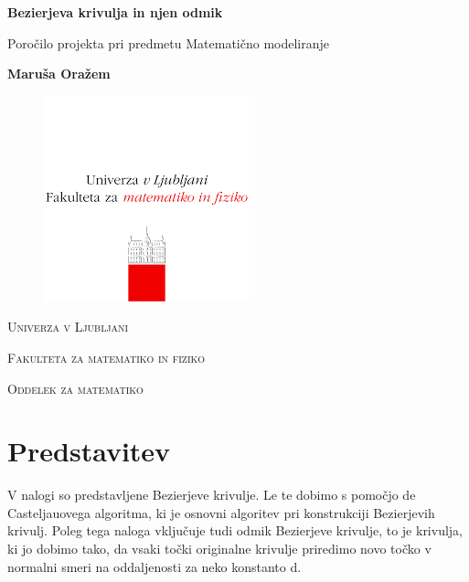 \documentclass{article}
\begin{document}
\begin{titlepage}
   \begin{center}
       \vspace*{1cm}
 
       \textbf{\Huge{Bezierjeva krivulja in njen odmik}}
 
       \vspace{0.5cm}
        \Large{Poročilo projekta pri predmetu Matematično modeliranje}
 
       \vspace{1.5cm}
    \vfill
       \textbf{Maruša Oražem}
 
       
 \begin{figure}[!ht]
\centering
       \includegraphics{fmf.png}
\end{figure}
 
       \textsc{\large{Univerza v Ljubljani}}
    
        \textsc{\large{Fakulteta za matematiko in fiziko}}
    
     \textsc{\large{Oddelek za matematiko}}
    \vfill\vfill
 
   \end{center}
\end{titlepage}






\tableofcontents











\newpage

\section{Predstavitev}
V nalogi so predstavljene Bezierjeve krivulje. Le te dobimo s pomočjo de Casteljauovega algoritma, ki je osnovni algoritev pri konstrukciji Bezierjevih krivulj. Poleg tega naloga vključuje tudi odmik Bezierjeve krivulje, to je krivulja, ki jo dobimo tako, da vsaki točki originalne krivulje priredimo novo točko v normalni smeri na oddaljenosti za neko konstanto d.
\end{document}

